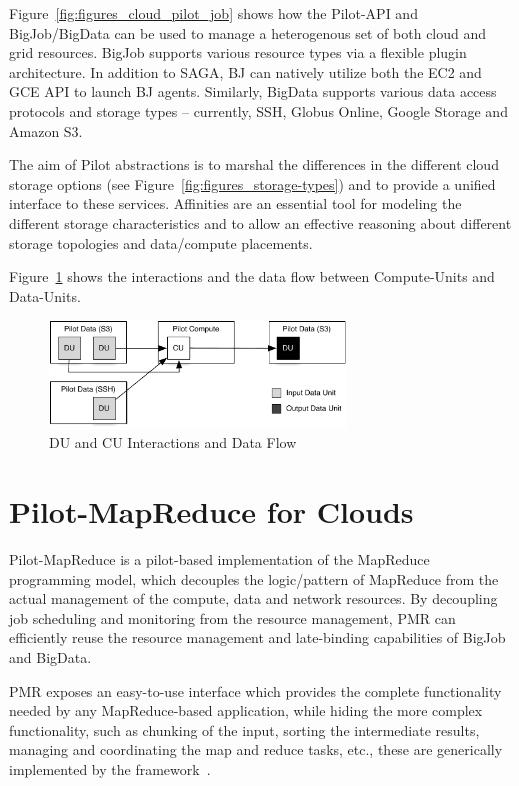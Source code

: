 \documentclass[times]{cpeauth}
\newcommand{\computeunits}{Compute-Units\xspace}
\newcommand{\dataunits}{Data-Units\xspace}
\begin{document}
Figure~\ref{fig:figures_cloud_pilot_job} shows how the Pilot-API and 
BigJob/BigData can be used to manage a heterogenous set of both cloud and grid 
resources. BigJob supports various resource types via a flexible plugin 
architecture. In addition to SAGA, BJ can natively utilize both the EC2 and 
GCE API to launch BJ agents. Similarly, BigData supports various data access
protocols and storage types -- currently, SSH, Globus Online, Google Storage
and Amazon S3.


The aim of Pilot abstractions is to marshal the differences in the different 
cloud storage options (see Figure~\ref{fig:figures_storage-types}) and to 
provide a unified interface to these services. Affinities are an essential 
tool for modeling the different storage characteristics and to allow an 
effective reasoning about different storage topologies and data/compute 
placements.


Figure~\ref{fig:figures_data-flow} shows the interactions and the data flow 
between \computeunits and \dataunits.
\begin{figure}[htbp]
	\centering
		\includegraphics[width=0.7\textwidth]{figures/data-flow.pdf}
	\caption{DU and CU Interactions and Data Flow}
	\label{fig:figures_data-flow}
\end{figure}



\section{Pilot-MapReduce for Clouds}

Pilot-MapReduce is a pilot-based implementation of the MapReduce
programming model, which decouples the logic/pattern of MapReduce from
the actual management of the compute, data and network resources. By
decoupling job scheduling and monitoring from the resource management,
PMR can efficiently reuse the resource management and late-binding
capabilities of BigJob and BigData.

PMR exposes an easy-to-use interface which provides the complete
functionality needed by any MapReduce-based application, while hiding
the more complex functionality, such as chunking of the input, sorting
the intermediate results, managing and coordinating the map and reduce
tasks, etc., these are generically implemented by the
framework~\cite{pmr2012}.
\end{document}
